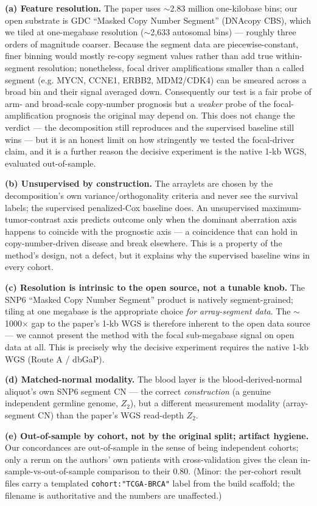 \documentclass[11pt]{article}
\begin{document}
\textbf{(a) Feature resolution.} The paper uses $\sim$2.83 million one-kilobase
bins; our open substrate is GDC ``Masked Copy Number Segment'' (DNAcopy CBS),
which we tiled at one-megabase resolution ($\sim$2{,}633 autosomal bins) ---
roughly three orders of magnitude coarser. Because the segment data are
piecewise-constant, finer binning would mostly re-copy segment values rather than
add true within-segment resolution; nonetheless, focal driver amplifications
smaller than a called segment (e.g. MYCN, CCNE1, ERBB2, MDM2/CDK4) can be smeared
across a broad bin and their signal averaged down. Consequently our test is a fair
probe of arm- and broad-scale copy-number prognosis but a \emph{weaker} probe of
the focal-amplification prognosis the original may depend on. This does not change
the verdict --- the decomposition still reproduces and the supervised baseline
still wins --- but it is an honest limit on how stringently we tested the
focal-driver claim, and it is a further reason the decisive experiment is the
native 1-kb WGS, evaluated out-of-sample.

\textbf{(b) Unsupervised by construction.} The arraylets are chosen by the
decomposition's own variance/orthogonality criteria and never see the survival
labels; the supervised penalized-Cox baseline does. An unsupervised
maximum-tumor-contrast axis predicts outcome only when the dominant aberration
axis happens to coincide with the prognostic axis --- a coincidence that can hold
in copy-number-driven disease and break elsewhere. This is a property of the
method's design, not a defect, but it explains why the supervised baseline wins in
every cohort.

\textbf{(c) Resolution is intrinsic to the open source, not a tunable knob.} The
SNP6 ``Masked Copy Number Segment'' product is natively segment-grained; tiling at
one megabase is the appropriate choice \emph{for array-segment data}. The
$\sim$1000$\times$ gap to the paper's 1-kb WGS is therefore inherent to the open
data source --- we cannot present the method with the focal sub-megabase signal on
open data at all. This is precisely why the decisive experiment requires the native
1-kb WGS (Route A / dbGaP).

\textbf{(d) Matched-normal modality.} The blood layer is the blood-derived-normal
aliquot's own SNP6 segment CN --- the correct \emph{construction} (a genuine
independent germline genome, $Z_2$), but a different measurement modality
(array-segment CN) than the paper's WGS read-depth $Z_2$.

\textbf{(e) Out-of-sample by cohort, not by the original split; artifact hygiene.}
Our concordances are out-of-sample in the sense of being independent cohorts; only
a rerun on the authors' own patients with cross-validation gives the clean
in-sample-vs-out-of-sample comparison to their 0.80. (Minor: the per-cohort result
files carry a templated \texttt{cohort:"TCGA-BRCA"} label from the build scaffold;
the filename is authoritative and the numbers are unaffected.)
\end{document}
